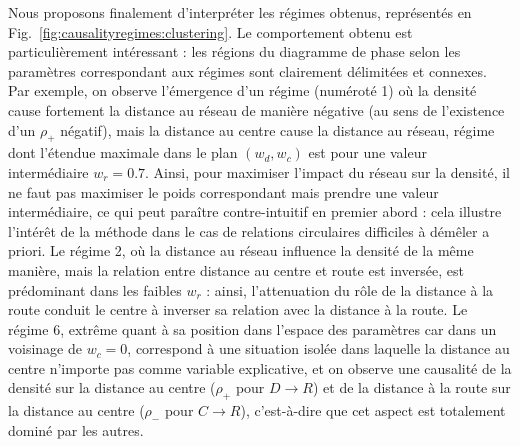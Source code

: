 {Nous proposons finalement d'interpréter les régimes obtenus, représentés en Fig.~\ref{fig:causalityregimes:clustering}. Le comportement obtenu est particulièrement intéressant : les régions du diagramme de phase selon les paramètres correspondant aux régimes sont clairement délimitées et connexes. Par exemple, on observe l'émergence d'un régime (numéroté 1) où la densité cause fortement la distance au réseau de manière négative (au sens de l'existence d'un $\rho_+$ négatif), mais la distance au centre cause la distance au réseau, régime dont l'étendue maximale dans le plan $(w_d,w_c)$ est pour une valeur intermédiaire $w_r=0.7$. Ainsi, pour maximiser l'impact du réseau sur la densité, il ne faut pas maximiser le poids correspondant mais prendre une valeur intermédiaire, ce qui peut paraître contre-intuitif en premier abord : cela illustre l'intérêt de la méthode dans le cas de relations circulaires difficiles à démêler a priori. Le régime 2, où la distance au réseau influence la densité de la même manière, mais la relation entre distance au centre et route est inversée, est prédominant dans les faibles $w_r$ : ainsi, l'attenuation du rôle de la distance à la route conduit le centre à inverser sa relation avec la distance à la route. Le régime 6, extrême quant à sa position dans l'espace des paramètres car dans un voisinage de $w_c = 0$, correspond à une situation isolée dans laquelle la distance au centre n'importe pas comme variable explicative, et on observe une causalité de la densité sur la distance au centre ($\rho_+$ pour $D\rightarrow R$) et de la distance à la route sur la distance au centre ($\rho_-$ pour $C\rightarrow R$), c'est-à-dire que cet aspect est totalement dominé par les autres.
}












